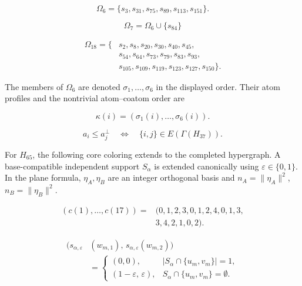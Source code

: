 \documentclass[aps,pra,reprint,superscriptaddress,longbibliography,nofootinbib,floatfix,10pt]{revtex4-2}
\theoremstyle{definition}
\begin{document}
\begin{equation}\label{h:eq:six-separating}
\Omega_6=\{s_3,s_{31},s_{75},s_{89},s_{113},s_{151}\}.
\end{equation}

\begin{equation}\label{h:eq:seven-separating}
\Omega_7=\Omega_6\cup\{s_{84}\}
\end{equation}

\begin{equation}\label{h:eq:eighteen-order-family}
\begin{split}
\Omega_{18}=\{&s_2,s_8,s_{20},s_{30},s_{40},s_{45},\\
&s_{54},s_{64},s_{73},s_{79},s_{83},s_{93},\\
&s_{105},s_{109},s_{119},s_{123},s_{127},s_{150}\}.
\end{split}
\end{equation}

The members of $\Omega_6$ are denoted $\sigma_1,\ldots,\sigma_6$ in the displayed order. Their atom profiles and the nontrivial atom--coatom order are

\begin{equation}\label{h:eq:canonical-profile}
\kappa(i)=(\sigma_1(i),\ldots,\sigma_6(i)).
\end{equation}

\begin{equation}\label{h:eq:pasting-order}
a_i\le a_j^\perp\quad\Longleftrightarrow\quad
\{i,j\}\in E(\Gamma(H_{37})).
\end{equation}

For $H_{65}$, the following core coloring extends to the completed hypergraph. A base-compatible independent support $S_\alpha$ is extended canonically using $\varepsilon\in\{0,1\}$. In the plane formula, $\eta_A,\eta_B$ are an integer orthogonal basis and $n_A=\|\eta_A\|^2$, $n_B=\|\eta_B\|^2$.

\begin{equation}\label{d:eq:h65-coordinates}
\begin{split}
(c(1),\ldots,c(17))={}&(0,1,2,3,0,1,2,4,0,1,3,\\
&3,4,2,1,0,2).
\end{split}
\end{equation}

\begin{equation}\label{d:eq:canonical-states}
\begin{aligned}
\bigl(s_{\alpha,\varepsilon}&(w_{m,1}),\,s_{\alpha,\varepsilon}(w_{m,2})\bigr)\\
&=\begin{cases}
(0,0), & |S_\alpha\cap\{u_m,v_m\}|=1,\\
(1-\varepsilon,\,\varepsilon), & S_\alpha\cap\{u_m,v_m\}=\emptyset.
\end{cases}
\end{aligned}
\end{equation}
\end{document}
